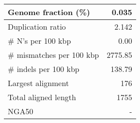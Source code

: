 \documentclass[12pt,a4paper]{article}
\begin{document}
\begin{table}[ht]
\begin{center}
\begin{tabular}{|l*{1}{|r}|}
Genome fraction (\%) & 0.035 \\ \hline
Duplication ratio & 2.142 \\ \hline
\# N's per 100 kbp & 0.00 \\ \hline
\# mismatches per 100 kbp & 2775.85 \\ \hline
\# indels per 100 kbp & 138.79 \\ \hline
Largest alignment & 176 \\ \hline
Total aligned length & 1755 \\ \hline
NGA50 & - \\ \hline
\end{tabular}
\end{center}
\end{table}
\end{document}
